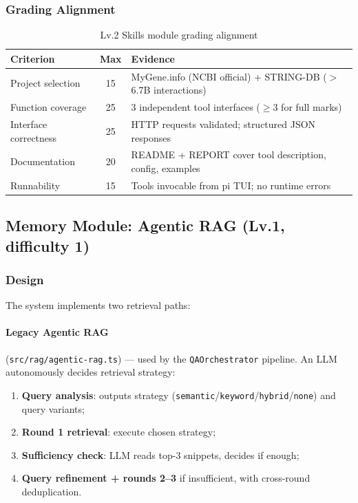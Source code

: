 \documentclass[12pt, a4paper]{article}
\begin{document}
\subsubsection{Grading Alignment}

\begin{table}[ht]
\centering
\caption{Lv.2 Skills module grading alignment}
\begin{tabular}{lcp{7cm}}
\toprule
\textbf{Criterion} & \textbf{Max} & \textbf{Evidence} \\
\midrule
Project selection    & 15 & MyGene.info (NCBI official) + STRING-DB ($>$6.7B interactions) \\
Function coverage    & 25 & 3 independent tool interfaces ($\ge3$ for full marks) \\
Interface correctness & 25 & HTTP requests validated; structured JSON responses \\
Documentation        & 20 & README + REPORT cover tool description, config, examples \\
Runnability          & 15 & Tools invocable from pi TUI; no runtime errors \\
\bottomrule
\end{tabular}
\end{table}

\subsection{Memory Module: Agentic RAG (Lv.1, difficulty 1)}

\subsubsection{Design}

The system implements two retrieval paths:

\paragraph{Legacy Agentic RAG} (\texttt{src/rag/agentic-rag.ts}) --- used by the
\texttt{QAOrchestrator} pipeline. An LLM autonomously decides retrieval strategy:

\begin{enumerate}[nosep]
  \item \textbf{Query analysis}: outputs strategy (\texttt{semantic}/\texttt{keyword}/\texttt{hybrid}/\texttt{none}) and query variants;
  \item \textbf{Round 1 retrieval}: execute chosen strategy;
  \item \textbf{Sufficiency check}: LLM reads top-3 snippets, decides if enough;
  \item \textbf{Query refinement + rounds 2--3} if insufficient, with cross-round deduplication.
\end{enumerate}
\end{document}
